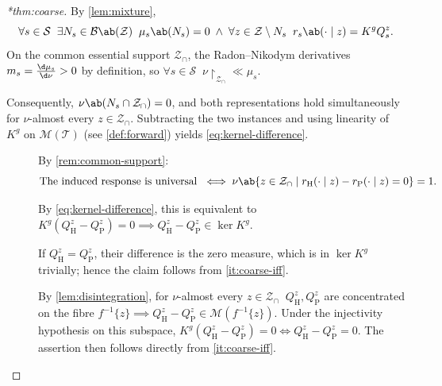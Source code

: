 \documentclass[12pt]{article}
\newcommand{\Herwig}{\mathrm{H}}
\newcommand{\Pythia}{\mathrm{P}}
\newcommand{\Gens}{\mathcal{S}}
\newcommand{\Sgn}{\mathcal{M}}
\newcommand{\Borel}{\mathcal{B}}
\newcommand{\supp}{\mathcal{Z}_{\cap}}
\newcommand{\1}{\mathbbm{1}}
\renewcommand{\[}{\begin{equation}}
\renewcommand{\]}{\end{equation}}
\begin{document}
\begin{proof}[*thm:coarse]
    By \cref{lem:mixture},
    \[
        \forall s \in \Gens\;\; \exists N_s \in \Borel \ab(\mathcal Z) \;\;  \mu_s \ab(N_s) = 0 \;\land\; \forall z \in \mathcal Z \setminus N_s \;\; r_s \ab( \cdot \mid z) = K^g Q_s^z.
    \]
    On the common essential support \(\supp\), the Radon--Nikodym derivatives \(m_s = \frac{\d\mu_s}{\d\nu} > 0\) by definition, so \(\forall s \in \Gens \;\; \nu\restriction_{\supp} \ll \mu_s\).
    
    Consequently, \(\nu \ab(N_s \cap \supp) = 0\), and both representations hold simultaneously for \(\nu\)-almost every \(z \in \supp\).
    Subtracting the two instances and using linearity of \(K^g\) on \(\Sgn(\mathcal T)\) (see \cref{def:forward}) yields \cref{eq:kernel-difference}.

        \begin{description}
            \item[] By \cref{rem:common-support}:
                \[
                    \text{The induced response is universal } \iff \nu \ab\{ z \in \supp \mid r_\Herwig(\cdot \mid z) - r_\Pythia(\cdot \mid z) = 0 \} = 1.
                \]
                
                By \cref{eq:kernel-difference}, this is equivalent to \( K^g( Q_\Herwig^z - Q_\Pythia^z) = 0 \implies Q_\Herwig^z - Q_\Pythia^z \in \ker K^g\).
            \item[] If \(Q_\Herwig^z = Q_\Pythia^z\), their difference is the zero measure, which is in \(\ker K^g\) trivially; hence the claim follows from \cref{it:coarse-iff}.
            \item[] By \cref{lem:disintegration}, for \(\nu\)-almost every \(z \in \supp\;\; Q_\Herwig^z, Q_\Pythia^z \) are concentrated on the fibre \(f^{-1}\{z\}  \implies Q_\Herwig^z - Q_\Pythia^z \in \Sgn(f^{-1}\{z\})\).
            Under the injectivity hypothesis on this subspace, \( K^g( Q_\Herwig^z - Q_\Pythia^z) = 0 \iff Q_\Herwig^z - Q_\Pythia^z = 0\).
            The assertion then follows directly from \cref{it:coarse-iff}.
        \end{description}
    \end{proof}
\end{document}

